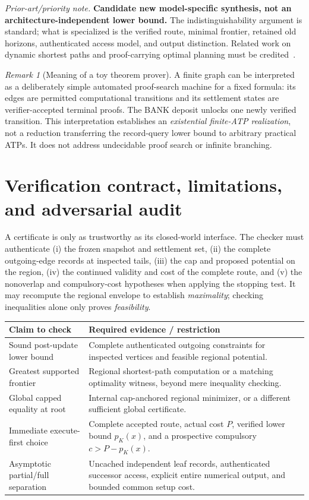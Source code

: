 \documentclass[11pt,letterpaper]{article}
\theoremstyle{definition}
\theoremstyle{remark}
\newtheorem{remark}[theorem]{Remark}
\newcommand{\novel}[1]{\par\begingroup\small\textit{Prior-art/priority note.} #1\par\endgroup}
\begin{document}
\novel{\textbf{Candidate new model-specific synthesis, not an architecture-independent lower bound.} The indistinguishability argument is standard; what is specialized is the verified route, minimal frontier, retained old horizons, authenticated access model, and output distinction. Related work on dynamic shortest paths and proof-carrying optimal planning must be credited~\cite{Ramalingam1996,Koenig2004,Mugdan2023,Dold2025,Settlement}.}

\begin{remark}[Meaning of a toy theorem prover]
A finite graph can be interpreted as a deliberately simple automated proof-search machine for a fixed formula: its edges are permitted computational transitions and its settlement states are verifier-accepted terminal proofs. The BANK deposit unlocks one newly verified transition. This interpretation establishes an \emph{existential finite-ATP realization}, not a reduction transferring the record-query lower bound to arbitrary practical ATPs. It does not address undecidable proof search or infinite branching.
\end{remark}

\section{Verification contract, limitations, and adversarial audit}
A certificate is only as trustworthy as its closed-world interface. The checker must authenticate (i) the frozen snapshot and settlement set, (ii) the complete outgoing-edge records at inspected tails, (iii) the cap and proposed potential on the region, (iv) the continued validity and cost of the complete route, and (v) the nonoverlap and compulsory-cost hypotheses when applying the stopping test. It may recompute the regional envelope to establish \emph{maximality}; checking inequalities alone only proves \emph{feasibility}.

\begin{center}\small
\begin{tabularx}{\linewidth}{@{}p{.32\linewidth}X@{}}
\toprule
\textbf{Claim to check}&\textbf{Required evidence / restriction}\\\midrule
Sound post-update lower bound&Complete authenticated outgoing constraints for inspected vertices and feasible regional potential.\\
Greatest supported frontier&Regional shortest-path computation or a matching optimality witness, beyond mere inequality checking.\\
Global capped equality at root&Internal cap-anchored regional minimizer, or a different sufficient global certificate.\\
Immediate execute-first choice&Complete accepted route, actual cost $P$, verified lower bound $p_K(x)$, and a prospective compulsory $c>P-p_K(x)$.\\
Asymptotic partial/full separation&Uncached independent leaf records, authenticated successor access, explicit entire numerical output, and bounded common setup cost.\\\bottomrule
\end{tabularx}
\end{center}
\end{document}
